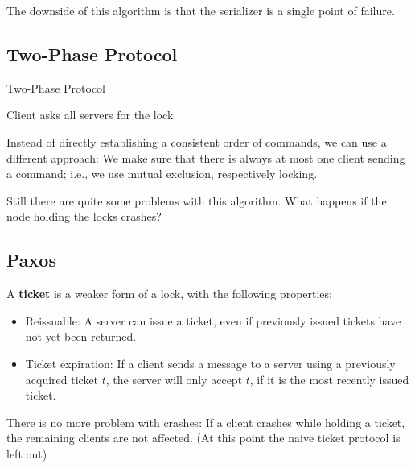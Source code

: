 \medskip

The downside of this algorithm is that the serializer is a single point of failure.

\subsection{Two-Phase Protocol}

\begin{algorithm}[H]
\caption{Two-Phase Protocol}
	Client asks all servers for the lock \\
\end{algorithm}

\medskip

Instead of directly establishing a consistent order of commands, we can use a different approach: We make sure that there is always at most one client sending a command; i.e., we use mutual exclusion, respectively locking. \medskip

Still there are quite some problems with this algorithm. What happens if the node holding the locks crashes?

\subsection{Paxos}

A \textbf{ticket} is a weaker form of a lock, with the following properties:
\begin{itemize}
	\item Reissuable: A server can issue a ticket, even if previously issued tickets have not yet been returned.
	\item Ticket expiration: If a client sends a message to a server using a previously acquired ticket $t$, the server will only accept $t$, if it is the most recently issued ticket.
\end{itemize}

There is no more problem with crashes: If a client crashes while holding a ticket, the remaining clients are not affected. (At this point the naive ticket protocol is left out) \medskip

